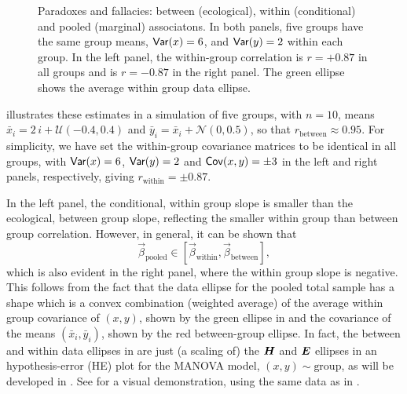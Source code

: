 \begin{figure}[htb]
\begin{minipage}[b]{.49\linewidth}
 \end{minipage}
  \caption{Paradoxes and fallacies: between (ecological), within (conditional) and pooled (marginal) associatons.
  In both panels, five groups have the same group means, $\mathsf{Var}(x)=6$, and $\mathsf{Var}(y)=2$ within each group.
  In the left panel, the within-group correlation is $r = +0.87$ in all groups and is $r = -0.87$ in the right panel.
  The green ellipse shows the average within group data ellipse.}
  \label{fig:between-within}
\end{figure}
 
 illustrates these estimates in a simulation of five groups, with $n=10$,  means 
$\bar{x}_i = 2 \, i + \mathcal{U}(-0.4, 0.4)$  and
$\bar{y}_i = \bar{x}_i + \mathcal{N}(0, 0.5)$, so that $r_{\textrm{between}} \approx 0.95$.
For simplicity, we have set the within-group covariance matrices to be identical in all groups, with
$\mathsf{Var}(x)=6$, $\mathsf{Var}(y)=2$ and $\mathsf{Cov}(x,y)=\pm 3$ in the left and right panels, respectively, giving
$r_{\textrm{within}} = \pm 0.87$.

In the left panel, the conditional, within group slope is smaller than the ecological, between group slope,
reflecting the smaller within group than between group correlation.
However, in general, it can be shown that
\begin{equation*}
\vec{\beta}_{\textrm{pooled}} \in [\vec{\beta}_{\textrm{within}} , \vec{\beta}_{\textrm{between}} ] \comma
\end{equation*}
which is also evident in the right panel, where the within group slope is negative.
This follows from the fact that the data ellipse for the pooled total sample
has a shape which is a convex combination (weighted average) of the average within group
covariance of $(x, y)$, shown by the green ellipse in     
and the  covariance of the means $(\bar{x}_i, \bar{y}_i)$, shown by the red between-group ellipse.
In fact, the between and within data ellipses in   
are just (a scaling of) the $\bm{H}$ and $\bm{E}$ ellipses in an hypothesis-error (HE) plot for the 
MANOVA model, $(x, y) \sim \textrm{group}$, as will be developed in .   
See  for a visual demonstration, using the same data  as in   .                                                              

